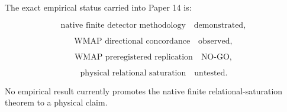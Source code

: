 The exact empirical status carried into Paper 14 is:

\[
\text{native finite detector methodology}
\quad
\text{demonstrated},
\]

\[
\text{WMAP directional concordance}
\quad
\text{observed},
\]

\[
\text{WMAP preregistered replication}
\quad
\text{NO-GO},
\]

\[
\text{physical relational saturation}
\quad
\text{untested}.
\]

No empirical result currently promotes the native finite
relational-saturation theorem to a physical claim.
